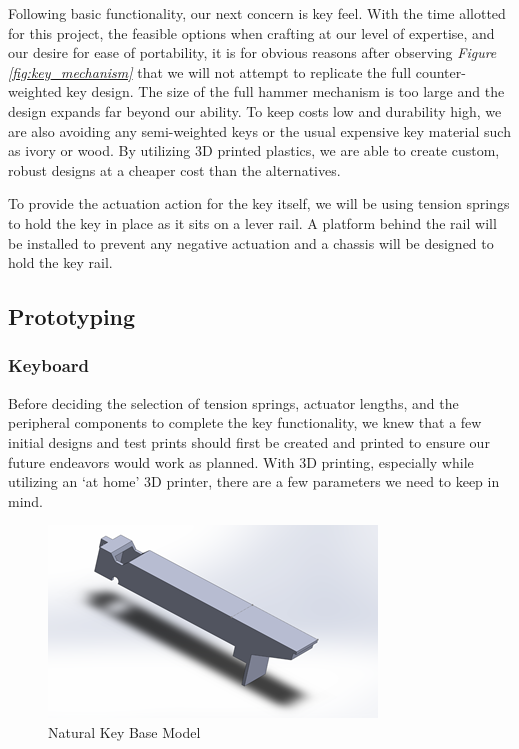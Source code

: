 Following basic functionality, our next concern is key feel. With the time allotted for this project, the feasible options when crafting at our level of expertise, and our desire for ease of portability, it is for obvious reasons after observing \textit{Figure \ref{fig:key_mechanism}} that we will not attempt to replicate the full counter-weighted key design. The size of the full hammer mechanism is too large and the design expands far beyond our ability. To keep costs low and durability high, we are also avoiding any semi-weighted keys or the usual expensive key material such as ivory or wood. By utilizing 3D printed plastics, we are able to create custom, robust designs at a cheaper cost than the alternatives.

To provide the actuation action for the key itself, we will be using tension springs to hold the key in place as it sits on a lever rail. A platform behind the rail will be installed to prevent any negative actuation and a chassis will be designed to hold the key rail.

\subsection{Prototyping}

\subsubsection{Keyboard}

Before deciding the selection of tension springs, actuator lengths, and the peripheral components to complete the key functionality, we knew that a few initial designs and test prints should first be created and printed to ensure our future endeavors would work as planned. With 3D printing, especially while utilizing an ‘at home’ 3D printer, there are a few parameters we need to keep in mind.

\begin{figure}[h!]
  \centering
  \includegraphics[width=0.7\linewidth]{image/WhiteModel1.png}
  \caption{Natural Key Base Model}
  \label{fig:white_model1}
\end{figure}

